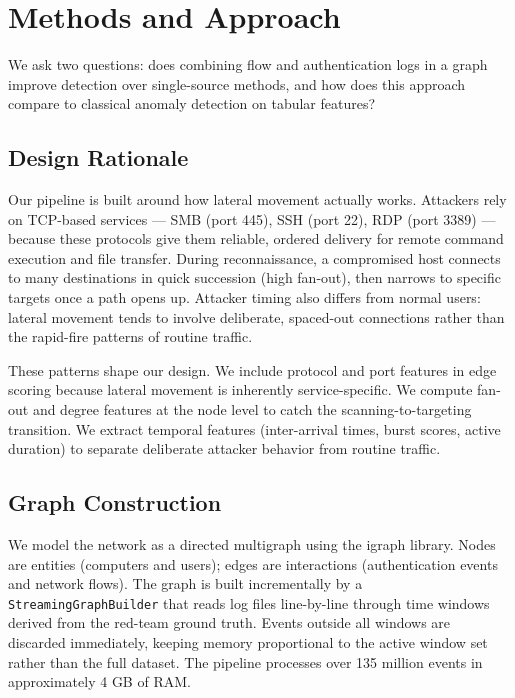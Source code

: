\section{Methods and Approach}

We ask two questions: does combining flow and authentication logs in a graph improve detection over single-source methods, and how does this approach compare to classical anomaly detection on tabular features?

\subsection{Design Rationale}

Our pipeline is built around how lateral movement actually works. Attackers rely on TCP-based services --- SMB (port 445), SSH (port 22), RDP (port 3389) --- because these protocols give them reliable, ordered delivery for remote command execution and file transfer. During reconnaissance, a compromised host connects to many destinations in quick succession (high fan-out), then narrows to specific targets once a path opens up. Attacker timing also differs from normal users: lateral movement tends to involve deliberate, spaced-out connections rather than the rapid-fire patterns of routine traffic.

These patterns shape our design. We include protocol and port features in edge scoring because lateral movement is inherently service-specific. We compute fan-out and degree features at the node level to catch the scanning-to-targeting transition. We extract temporal features (inter-arrival times, burst scores, active duration) to separate deliberate attacker behavior from routine traffic.

\subsection{Graph Construction}

We model the network as a directed multigraph using the igraph library. Nodes are entities (computers and users); edges are interactions (authentication events and network flows). The graph is built incrementally by a \texttt{StreamingGraphBuilder} that reads log files line-by-line through time windows derived from the red-team ground truth. Events outside all windows are discarded immediately, keeping memory proportional to the active window set rather than the full dataset. The pipeline processes over 135 million events in approximately 4 GB of RAM.

